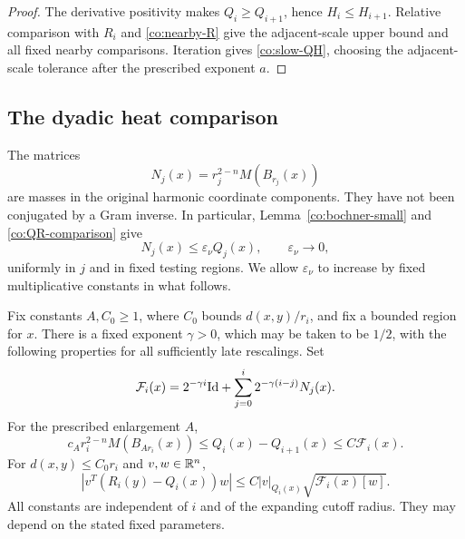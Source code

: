 \begin{proof}
The derivative positivity makes \(Q_i\ge Q_{i+1}\), hence
\(H_i\le H_{i+1}\).  Relative comparison with \(R_i\) and
\eqref{co:nearby-R} give the adjacent-scale upper bound and all
fixed nearby comparisons.  Iteration gives
\eqref{co:slow-QH}, choosing the adjacent-scale tolerance after
the prescribed exponent \(a\).
\end{proof}

\subsection{The dyadic heat comparison}

The matrices
\begin{equation}\label{co:N-definition}
 N_j(x)=r_j^{2-n}M(B_{r_j}(x))
\end{equation}
are masses in the original harmonic coordinate components.  They
have not been conjugated by a Gram inverse.  In particular,
Lemma~\ref{co:bochner-small} and \eqref{co:QR-comparison} give
\begin{equation}\label{co:N-small}
 N_j(x)\le\varepsilon_\nu Q_j(x),
 \qquad \varepsilon_\nu\longrightarrow0,
\end{equation}
uniformly in \(j\) and in fixed testing regions.  We allow
\(\varepsilon_\nu\) to increase by fixed multiplicative constants
in what follows.

\begin{lemma}\label{co:heat-comparison}
Fix constants \(A,C_0\ge1\), where \(C_0\) bounds
\(d(x,y)/r_i\), and fix a bounded region for \(x\).
There is a fixed exponent \(\gamma>0\), which
may be taken to be \(1/2\), with the following properties for all
sufficiently late rescalings.  Set
\begin{equation}\label{co:F-definition}
 \mathcal F_i(x)=2^{-\gamma i}\mathrm{Id}+
       \sum_{j=0}^i2^{-\gamma(i-j)}N_j(x).
\end{equation}
For the prescribed enlargement \(A\),
\begin{equation}\label{co:heat-decrement}
 c_A r_i^{2-n}M(B_{Ar_i}(x))
 \le Q_i(x)-Q_{i+1}(x)\le C\mathcal F_i(x).
\end{equation}
For \(d(x,y)\le C_0r_i\) and \(v,w\in\mathbb R^n\),
\begin{equation}\label{co:bilinear-heat-comparison}
 |v^T(R_i(y)-Q_i(x))w|
 \le C|v|_{Q_i(x)}\sqrt{\mathcal F_i(x)[w]}.
\end{equation}
All constants are independent of \(i\) and of the expanding
cutoff radius.  They may depend on the stated fixed parameters.
\end{lemma}

